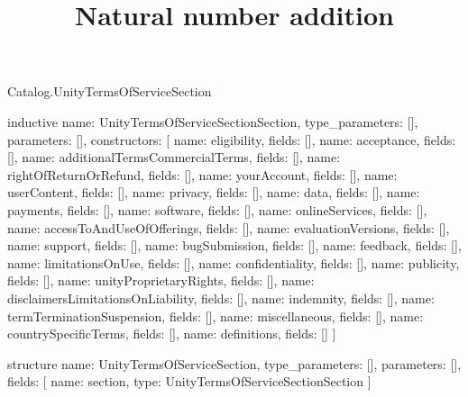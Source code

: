 \begin{lexlean}{Catalog.UnityTermsOfServiceSection}
\title{Natural number addition}
\begin{semanticmodule}
inductive{
  name: UnityTermsOfServiceSectionSection,
  type_parameters: [],
  parameters: [],
  constructors: [
    {name: eligibility, fields: []},
    {name: acceptance, fields: []},
    {name: additionalTermsCommercialTerms, fields: []},
    {name: rightOfReturnOrRefund, fields: []},
    {name: yourAccount, fields: []},
    {name: userContent, fields: []},
    {name: privacy, fields: []},
    {name: data, fields: []},
    {name: payments, fields: []},
    {name: software, fields: []},
    {name: onlineServices, fields: []},
    {name: accessToAndUseOfOfferings, fields: []},
    {name: evaluationVersions, fields: []},
    {name: support, fields: []},
    {name: bugSubmission, fields: []},
    {name: feedback, fields: []},
    {name: limitationsOnUse, fields: []},
    {name: confidentiality, fields: []},
    {name: publicity, fields: []},
    {name: unityProprietaryRights, fields: []},
    {name: disclaimersLimitationsOnLiability, fields: []},
    {name: indemnity, fields: []},
    {name: termTerminationSuspension, fields: []},
    {name: miscellaneous, fields: []},
    {name: countrySpecificTerms, fields: []},
    {name: definitions, fields: []}
  ]
}

structure{
  name: UnityTermsOfServiceSection,
  type_parameters: [],
  parameters: [],
  fields: [
    {name: section, type: UnityTermsOfServiceSectionSection}
  ]
}
\end{semanticmodule}
\end{lexlean}
